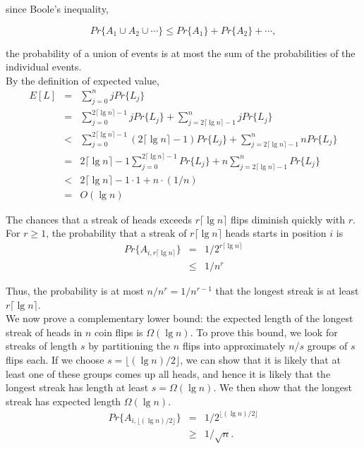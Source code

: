 \documentclass[12pt]{article}
\begin{document}
since Boole's inequality,

\begin{equation*}
  Pr \{ A_1 \cup A_2 \cup \cdots \} \le Pr \{ A_1 \} + Pr \{ A_2 \} + \cdots,
\end{equation*}

the probability of a union of events is at most the sum of the probabilities of the individual events. \\

By the definition of expected value,
\begin{eqnarray*}
  E[L]
  &=& \sum_{j=0}^{n} j Pr \{ L_j \} \\
  &=& \sum_{j=0}^{2 \lceil \lg n \rceil - 1} j Pr \{ L_j \}
      + \sum_{j = 2 \lceil \lg n \rceil - 1}^{n} j Pr \{ L_j \} \\
  &<& \sum_{j=0}^{2 \lceil \lg n \rceil - 1} (2 \lceil \lg n \rceil - 1)
      Pr \{ L_j \} + \sum_{j = 2 \lceil \lg n \rceil - 1}^{n} n Pr \{ L_j \} \\
  &=& 2 \lceil \lg n \rceil - 1 \sum_{j=0}^{2 \lceil \lg n \rceil - 1} 
      Pr \{ L_j \} + n \sum_{j = 2 \lceil \lg n \rceil - 1}^{n} Pr \{ L_j \} \\
  &<& 2 \lceil \lg n \rceil - 1 \cdot 1 + n \cdot (1/n) \\
  &=& O(\lg n)
\end{eqnarray*}

The chances that a streak of heads exceeds $r \lceil \lg n \rceil$ flips diminish quickly with $r$. For $r \ge 1$, the probability that a streak of $r \lceil \lg n \rceil$ heads starts in position $i$ is
\begin{eqnarray*}
  Pr \{ A_{i, r \lceil \lg n \rceil} \}
  &=& 1 / 2^{r \lceil \lg n \rceil} \\
  &\le& 1 / n^r
\end{eqnarray*}

Thus, the probability is at most $n / n^r = 1 / n^{r-1}$ that the longest streak is at least $r \lceil \lg n \rceil$. \\

We now prove a complementary lower bound: the expected length of the longest streak of heads in $n$ coin flips is $\Omega (\lg n)$. To prove this bound, we look for streaks of length $s$ by partitioning the $n$ flips into approximately $n/s$ groups of $s$ flips each. If we choose $s = \lfloor (\lg n)/2 \rfloor$, we can show that it is likely that at least one of these groups comes up all heads, and hence it is likely that the longest streak has length at least $s = \Omega (\lg n)$. We then show that the longest streak has expected length $\Omega (\lg n)$. \\
\begin{eqnarray*}
  Pr \{ A_{i, \lfloor (\lg n)/2 \rfloor} \}
  &=& 1 / 2^{\lfloor (\lg n)/2 \rfloor} \\
  &\ge& 1 / \sqrt n.
\end{eqnarray*}
\end{document}
